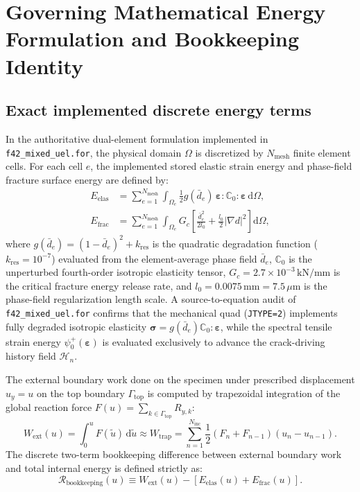 \section{Governing Mathematical Energy Formulation and Bookkeeping Identity}
\label{sec:mode1_energy_formulation}

\subsection{Exact implemented discrete energy terms}
In the authoritative dual-element formulation implemented in \nolinkurl{f42_mixed_uel.for}, the physical domain $\Omega$ is discretized by $N_{\mathrm{mesh}}$ finite element cells. For each cell $e$, the implemented stored elastic strain energy and phase-field fracture surface energy are defined by:
\begin{align}
  E_{\mathrm{elas}} &= \sum_{e=1}^{N_{\mathrm{mesh}}} \int_{\Omega_e} \frac{1}{2} g(\bar{d}_e)\,\boldsymbol{\varepsilon} : \mathbb{C}_0 : \boldsymbol{\varepsilon} \,\mathrm{d}\Omega, \label{eq:e_elas_def} \\
  E_{\mathrm{frac}} &= \sum_{e=1}^{N_{\mathrm{mesh}}} \int_{\Omega_e} G_c \left[ \frac{\bar{d}_e^2}{2 l_0} + \frac{l_0}{2} |\nabla d|^2 \right] \mathrm{d}\Omega, \label{eq:e_frac_def}
\end{align}
where $g(\bar{d}_e) = (1-\bar{d}_e)^2 + k_{\mathrm{res}}$ is the quadratic degradation function ($k_{\mathrm{res}} = 10^{-7}$) evaluated from the element-average phase field $\bar{d}_e$, $\mathbb{C}_0$ is the unperturbed fourth-order isotropic elasticity tensor, $G_c = 2.7\times 10^{-3}\,\mathrm{kN/mm}$ is the critical fracture energy release rate, and $l_0 = 0.0075\,\mathrm{mm} = 7.5\,\mu\mathrm{m}$ is the phase-field regularization length scale. A source-to-equation audit of \nolinkurl{f42_mixed_uel.for} confirms that the mechanical quad (\texttt{JTYPE=2}) implements fully degraded isotropic elasticity $\boldsymbol{\sigma} = g(\bar{d}_e) \mathbb{C}_0 : \boldsymbol{\varepsilon}$, while the spectral tensile strain energy $\psi_0^+(\boldsymbol{\varepsilon})$ is evaluated exclusively to advance the crack-driving history field $\mathcal{H}_n$.

The external boundary work done on the specimen under prescribed displacement $u_y = u$ on the top boundary $\Gamma_{\mathrm{top}}$ is computed by trapezoidal integration of the global reaction force $F(u) = \sum_{k \in \Gamma_{\mathrm{top}}} R_{y, k}$:
\begin{equation}
  W_{\mathrm{ext}}(u) = \int_0^u F(\tilde{u})\,\mathrm{d}\tilde{u} \approx W_{\mathrm{trap}} = \sum_{n=1}^{N_{\mathrm{inc}}} \frac{1}{2}\left( F_n + F_{n-1} \right) \left( u_n - u_{n-1} \right).
  \label{eq:w_ext_def}
\end{equation}
The discrete two-term bookkeeping difference between external boundary work and total internal energy is defined strictly as:
\begin{equation}
  \mathcal{R}_{\mathrm{bookkeeping}}(u) \equiv W_{\mathrm{ext}}(u) - \left[ E_{\mathrm{elas}}(u) + E_{\mathrm{frac}}(u) \right].
  \label{eq:r_bookkeeping_def}
\end{equation}

